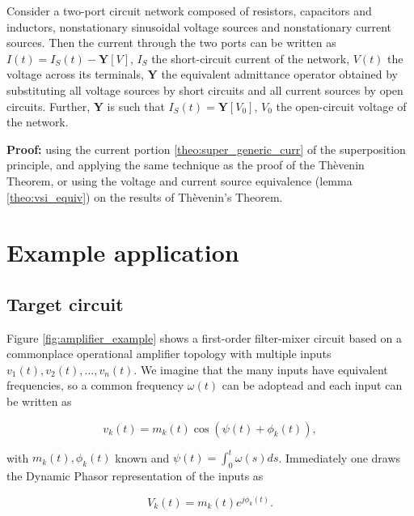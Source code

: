 \begin{theorem}\label{theo:norton} Consider a two-port circuit network composed of resistors, capacitors and inductors, nonstationary sinusoidal voltage sources and nonstationary current sources. Then the current through the two ports can be written as $I(t) = I_S(t) - \mathbf{Y}\left[V\right]$, $I_S$ the short-circuit current of the network, $V(t)$ the voltage across its terminals, $\mathbf{Y}$ the equivalent admittance operator obtained by substituting all voltage sources by short circuits and all current sources by open circuits. Further, $\mathbf{Y}$ is such that $I_S(t) = \mathbf{Y}\left[V_0\right]$, $V_0$ the open-circuit voltage of the network.
\end{theorem}
\textbf{Proof:} using the current portion \eqref{theo:super_generic_curr} of the superposition principle, and applying the same technique as the proof of the Thèvenin Theorem, or using the voltage and current source equivalence (lemma \ref{theo:vsi_equiv}) on the results of Thèvenin's Theorem.

\section{Example application}\label{sec:example_application} %

\subsection{Target circuit} %
	
	Figure \ref{fig:amplifier_example} shows a first-order filter-mixer circuit based on a commonplace operational amplifier topology with multiple inputs $v_1(t),v_2(t),...,v_n(t)$. We imagine that the many inputs have equivalent frequencies, so a common frequency $\omega(t)$ can be adoptead and each input can be written as

\begin{equation} v_k(t) = m_k(t)\cos\left(\psi(t) + \phi_k(t)\right), \label{eq:input_vis}\end{equation}

	\noindent with $m_k(t),\phi_k(t)$ known and $\psi(t)= \int_0^t \omega(s)ds$. Immediately one draws the Dynamic Phasor representation of the inputs as

\begin{equation} V_k(t) = m_k(t)e^{j\phi_k(t)}. \label{eq:phasor_input_vis}\end{equation}

